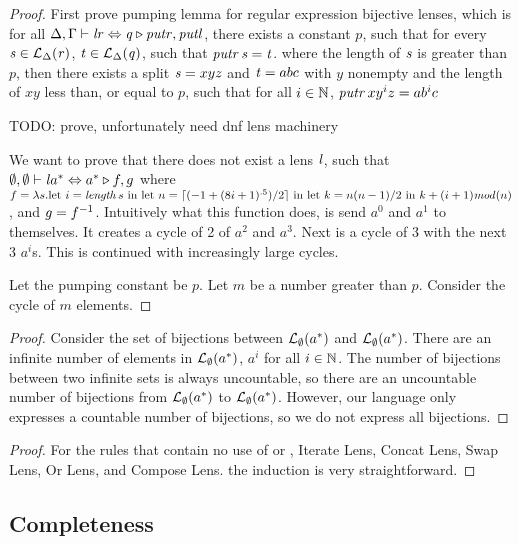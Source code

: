 \blic*
\begin{proof}
First prove pumping lemma for regular expression bijective lenses,
which is for all
$\Delta, \Gamma \vdash \mathit{l} \mathit{r} \Leftrightarrow \mathit{q} \triangleright \mathit{putr},\mathit{putl}$,
there exists a constant $p$,
such that for every $\mathit{s}\in\mathcal{L}_{\Delta}(\mathit{r})$,
$\mathit{t}\in\mathcal{L}_{\Delta}(\mathit{q})$,
such that $\mathit{putr} \, \mathit{s} = \mathit{t}$.
where the length of $\mathit{s}$ is greater than $p$,
then there exists a split $\mathit{s} = xyz$ and $\mathit{t} = abc$
with $y$ nonempty and the length of $xy$ less than, or equal to $p$,
such that for all $i\in\mathbb{N}$, $\mathit{putr} \, xy^iz = ab^ic$

TODO: prove, unfortunately need dnf lens machinery

We want to prove that there does not exist a lens $\mathit{l}$, such that
$\emptyset,\emptyset \vdash \mathit{l} a^* \Leftrightarrow a^* \triangleright f,g$
where $f = \lambda s.\text{let } i = \mathit{length} \, s\text{ in }
\text{let } n = \lceil(-1+(8i+1)^{.5})/2\rceil\text{ in }
\text{let } k = n(n-1)/2\text{ in }
k+(i+1)\mathit{mod}(n)$, and $g=f^{-1}$.
Intuitively what this function does, is send $a^0$ and $a^1$ to themselves.
It creates a cycle of 2 of $a^2$ and $a^3$.  Next is a cycle of 3 with the next 3 $a^i$s.
This is continued with increasingly large cycles.

Let the pumping constant be $p$.  Let $m$ be a number greater than $p$.  Consider
the cycle of $m$ elements.

\end{proof}
\begin{proof}
Consider the set of bijections between
$\mathcal{L}_{\emptyset}(a^*)$ and $\mathcal{L}_{\emptyset}(a^*)$.
There are an infinite number of elements in $\mathcal{L}_{\emptyset}(a^*)$,
$a^i$ for all $i\in\mathbb{N}$.
The number of bijections between two infinite sets is always uncountable, so there
are an uncountable number of bijections from $\mathcal{L}_{\emptyset}(a^*)$
to $\mathcal{L}_{\emptyset}(a^*)$.
However, our language only expresses a countable number of bijections,
so we do not express all bijections.
\end{proof}

\eclc*
\begin{proof}
For the rules that contain no use of \RegexContext{} or \LensContext{},
Iterate Lens, Concat Lens, Swap Lens, Or Lens, and Compose Lens.
the induction is very straightforward.
\end{proof}


\subsection{Completeness}

